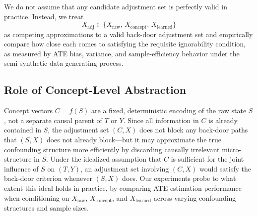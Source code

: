 \documentclass[11pt]{article}
\begin{document}
We do not assume that any candidate adjustment set is perfectly valid in practice. Instead, we treat
\[
X_{\text{adj}} \in \{ X_{\text{raw}},\, X_{\text{concept}},\, X_{\text{learned}} \}
\]
as competing approximations to a valid back-door adjustment set and empirically compare how close each comes to satisfying the requisite ignorability condition, as measured by ATE bias, variance, and sample-efficiency behavior under the semi-synthetic data-generating process.

\subsection*{Role of Concept-Level Abstraction}

Concept vectors \(C = f(S)\) are a fixed, deterministic encoding of the raw state
\(S\), not a separate causal parent of \(T\) or \(Y\). Since all information in \(C\)
is already contained in \(S\), the adjustment set \((C, X)\) does not block any
back-door paths that \((S, X)\) does not already block---but it may approximate
the true confounding structure more efficiently by discarding causally
irrelevant micro-structure in \(S\). Under the idealized assumption that \(C\) is
sufficient for the joint influence of \(S\) on \((T, Y)\), an adjustment set
involving \((C, X)\) would satisfy the back-door criterion whenever \((S, X)\) does.
Our experiments probe to what extent this ideal holds in practice, by comparing ATE
estimation performance when conditioning on \(X_{\text{raw}}\), \(X_{\text{concept}}\),
and \(X_{\text{learned}}\) across varying confounding structures and sample sizes.
\end{document}
